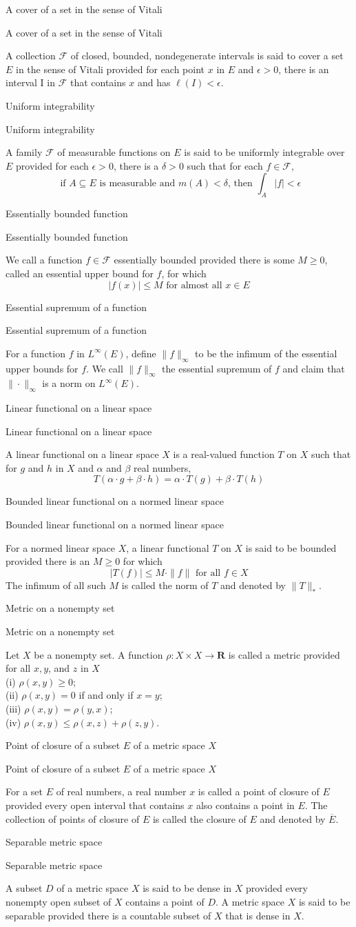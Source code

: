 \documentclass[17pt]{extarticle}
\renewcommand{\bar}[1]{\overline{#1}}
\newcommand{\boxset}[2]{\begin{mdframed}[style=darkQuesion]
#1
\end{mdframed}
\newpage
\begin{mdframed}[style=darkQuesion]
#1
  \end{mdframed}
\begin{mdframed}[style=darkAnswer]
#2
  \end{mdframed}
  \newpage
}
\begin{document}
\boxset{A cover of a set in the sense of Vitali}
{
A collection $\mathcal{F}$ of closed, bounded, nondegenerate intervals is said to cover a set $E$ in the sense of Vitali provided for each point $x$ in $E$ and $\epsilon>0$, there is an interval I in $\mathcal{F}$ that contains $x$ and has $\ell(I)<\epsilon$.
}%
\boxset{Uniform integrability}
{
A family $\mathcal{F}$ of measurable functions on $E$ is said to be uniformly integrable over $E$ provided for each $\epsilon>0$, there is a $\delta>0$ such that for each $f \in \mathcal{F}$,
\[
\text { if } A \subseteq E \text { is measurable and } m(A)<\delta \text {, then } \int_{A}|f|<\epsilon
\]
}%
\boxset{Essentially bounded function}
{
We call a function $f \in \mathcal{F}$ essentially bounded provided there is some $M \geq 0$, called an essential upper bound for $f$, for which
\[
|f(x)| \leq M \text { for almost all } x \in E
\]
}%
\boxset{Essential supremum of a function}
{
For a function $f$ in $L^{\infty}(E)$, define $\|f\|_{\infty}$ to be the infimum of the essential upper bounds for $f$. We call $\|f\|_{\infty}$ the essential supremum of $f$ and claim that $\|\cdot\|_{\infty}$ is a norm on $L^{\infty}(E)$.
}%
\boxset{Linear functional on a linear space}
{
A linear functional on a linear space $X$ is a real-valued function $T$ on $X$ such that for $g$ and $h$ in $X$ and $\alpha$ and $\beta$ real numbers,
\[
T(\alpha \cdot g+\beta \cdot h)=\alpha \cdot T(g)+\beta \cdot T(h)
\]
}%
\boxset{Bounded linear functional on a normed linear space}
{
For a normed linear space $X$, a linear functional $T$ on $X$ is said to be bounded provided there is an $M \geq 0$ for which
\[
|T(f)| \leq M \cdot\|f\| \text { for all } f \in X
\]
The infimum of all such $M$ is called the norm of $T$ and denoted by $\|T\|_{*}$.
}%
\boxset{Metric on a nonempty set}
{
Let $X$ be a nonempty set. A function $\rho: X \times X \rightarrow \mathbf{R}$ is called a metric provided for all $x, y$, and $z$ in $X$\[\ \]
(i) $\rho(x, y) \geq 0$;\[\ \]
(ii) $\rho(x, y)=0$ if and only if $x=y$;\[\ \]
(iii) $\rho(x, y)=\rho(y, x)$;\[\ \]
(iv) $\rho(x, y) \leq \rho(x, z)+\rho(z, y)$.
}%
\boxset{Point of closure of a subset $E$ of a metric space $X$}
{
For a set $E$ of real numbers, a real number $x$ is called a point of closure of $E$ provided every open interval that contains $x$ also contains a point in $E$. The collection of points of closure of $E$ is called the closure of $E$ and denoted by $\bar{E}$.
}%
\boxset{Separable metric space}
{
A subset $D$ of a metric space $X$ is said to be dense in $X$ provided every nonempty open subset of $X$ contains a point of $D$. A metric space $X$ is said to be separable provided there is a countable subset of $X$ that is dense in $X$.
}%
\end{document}
